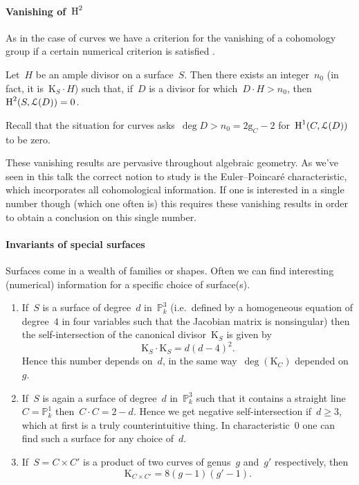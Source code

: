 \documentclass[10pt,a4paper]{article}
\begin{document}
\paragraph{Vanishing of~$\operatorname{H}^2$}
As in the case of curves we have a criterion for the vanishing of a cohomology group if a certain numerical criterion is satisfied \cite[lemma V.1.7]{hartshorne-algebraic-geometry}.
\begin{proposition}
  Let~$H$ be an ample divisor on a surface~$S$. Then there exists an integer~$n_0$ (in fact, it is~$\mathrm{K}_S\cdot H$) such that, if~$D$ is a divisor for which~$D\cdot H>n_0$, then~$\operatorname{H}^2(S,\mathcal{L}(D))=0$.
\end{proposition}
Recall that the situation for curves asks~$\deg D>n_0=2\mathrm{g}_C-2$ for~$\operatorname{H}^1(C,\mathcal{L}(D))$ to be zero.

These vanishing results are pervasive throughout algebraic geometry. As we've seen in this talk the correct notion to study is the Euler--Poincar\'e characteristic, which incorporates all cohomological information. If one is interested in a single number though (which one often is) this requires these vanishing results in order to obtain a conclusion on this single number.

\paragraph{Invariants of special surfaces}
Surfaces come in a wealth of families or shapes. Often we can find interesting (numerical) information for a specific choice of surface(s).
\begin{enumerate}
  \item If~$S$ is a surface of degree~$d$ in~$\mathbb{P}_k^3$ (i.e.\ defined by a homogeneous equation of degree~$4$ in four variables such that the Jacobian matrix is nonsingular) then the self-intersection of the canonical divisor~$\mathrm{K}_S$ is given by
    \begin{equation}
      \mathrm{K}_S\cdot\mathrm{K}_S=d(d-4)^2.
    \end{equation}
    Hence this number depends on~$d$, in the same way~$\deg(\mathrm{K}_C)$ depended on~$g$.
  \item If~$S$ is again a surface of degree~$d$ in~$\mathbb{P}_k^3$ such that it contains a straight line~$C=\mathbb{P}_k^1$ then~$C\cdot C=2-d$. Hence we get negative self-intersection if~$d\geq 3$, which at first is a truly counterintuitive thing. In characteristic~$0$ one can find such a surface for any choice of~$d$.
  \item If~$S=C\times C'$ is a product of two curves of genus~$g$ and~$g'$ respectively, then
    \begin{equation}
      \mathrm{K}_{C\times C'}=8(g-1)(g'-1).
    \end{equation}
\end{enumerate}
\end{document}
